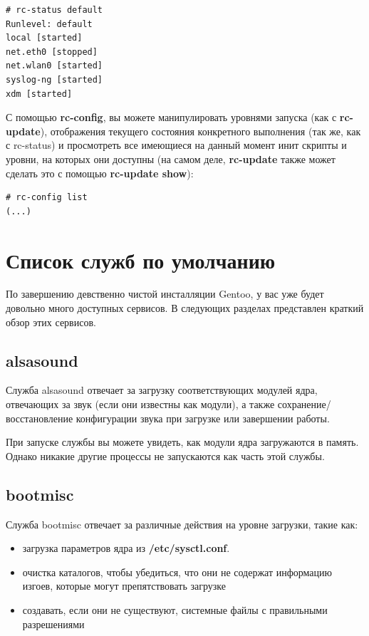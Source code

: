 \documentclass[10pt]{book}
\begin{document}
\begin{tcolorbox} 
\begin{lstlisting}
# rc-status default
Runlevel: default
local [started]
net.eth0 [stopped]
net.wlan0 [started]
syslog-ng [started]
xdm [started]
\end{lstlisting}
\end{tcolorbox}

С помощью \textbf{rc-config}, вы можете манипулировать уровнями запуска
(как с \textbf{rc-update}), отображения текущего состояния конкретного
выполнения (так же, как с rc-status) и просмотреть все имеющиеся на
данный момент инит скрипты и уровни, на которых они доступны (на самом
деле, \textbf{rc-update} также может сделать это с помощью \textbf{rc-update
show}):

\begin{tcolorbox} 
\begin{lstlisting}
# rc-config list
(...)
\end{lstlisting}
\end{tcolorbox}

\section{Список служб по умолчанию}

По завершению девственно чистой инсталляции Gentoo, у вас уже будет довольно много доступных сервисов. В следующих разделах представлен краткий обзор этих сервисов.

\subsection{alsasound}
Служба alsasound отвечает за загрузку соответствующих модулей ядра, отвечающих за звук (если они известны как модули), а также сохранение/восстановление конфигурации звука при загрузке или завершении работы.

При запуске службы вы можете увидеть, как модули ядра загружаются в память. Однако никакие другие процессы не запускаются как часть этой службы.

\subsection{bootmisc}
Служба bootmisc отвечает за различные действия на уровне загрузки, такие как:
\begin{itemize}
 \item загрузка параметров ядра из \textbf{/etc/sysctl.conf}.
 \item очистка каталогов, чтобы убедиться, что они не содержат информацию изгоев, которые могут препятствовать загрузке
 \item создавать, если они не существуют, системные файлы с правильными разрешениями
\end{itemize}
\end{document}
